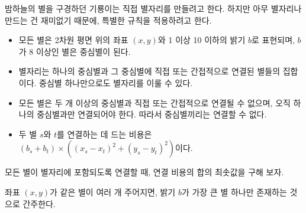 밤하늘의 별을 구경하던 기룡이는 직접 별자리를 만들려고 한다.
하지만 아무 별자리나 만드는 건 재미없기 때문에, 특별한 규칙을 적용하려고 한다.

\begin{itemize}
    \item 모든 별은 2차원 평면 위의 좌표 $(x, y)$와 1 이상 10 이하의 밝기 $b$로 표현되며, $b$가 8 이상인 별은 중심별이 된다.
    \item 별자리는 하나의 중심별과 그 중심별에 직접 또는 간접적으로 연결된 별들의 집합이다. 중심별 하나만으로도 별자리를 이룰 수 있다.
    \item 모든 별은 두 개 이상의 중심별과 직접 또는 간접적으로 연결될 수 없으며, 오직 하나의 중심별과만 연결되어야 한다. 따라서 중심별끼리는 연결할 수 없다.
    \item 두 별 $s$와 $t$를 연결하는 데 드는 비용은 $(b_{s}+b_{t})\times \left( (x_{s}-x_{t})^2+(y_{s}-y_{t})^2\right)$이다.
\end{itemize}

모든 별이 별자리에 포함되도록 연결할 때, 연결 비용의 합의 최솟값을 구해 보자.

좌표 $(x, y)$가 같은 별이 여러 개 주어지면, 밝기 $b$가 가장 큰 별 하나만 존재하는 것으로 간주한다.
